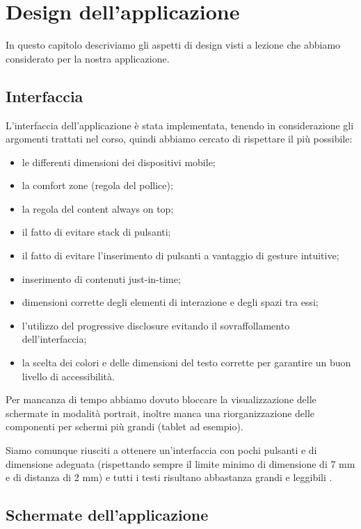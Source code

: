 \chapter{Design dell'applicazione\label{sec:design}}

In questo capitolo descriviamo gli aspetti di design visti a lezione che abbiamo considerato per la nostra applicazione.

\section{Interfaccia\label{sec:interfaccia}}
L'interfaccia dell'applicazione è stata implementata, tenendo in considerazione gli argomenti trattati nel corso, quindi abbiamo cercato di rispettare il più possibile:
\begin{itemize}
    \item le differenti dimensioni dei dispositivi mobile;%
    \item la comfort zone (regola del pollice);
    \item la regola del content always on top;
    \item il fatto di evitare stack di pulsanti;
    \item il fatto di evitare l'inserimento di pulsanti a vantaggio di gesture intuitive;
    \item inserimento di contenuti just-in-time;
    \item dimensioni corrette degli elementi di interazione e degli spazi tra essi;
    \item l'utilizzo del progressive disclosure evitando il sovraffollamento dell'interfaccia;
    \item la scelta dei colori e delle dimensioni del testo corrette per garantire un buon livello di accessibilità.
\end{itemize}

Per mancanza di tempo abbiamo dovuto bloccare la visualizzazione delle schermate in modalità portrait, inoltre manca una riorganizzazione delle componenti per schermi più grandi (tablet ad esempio).

Siamo comunque riusciti a ottenere un'interfaccia con pochi pulsanti e di dimensione adeguata (rispettando sempre il limite minimo di dimensione di 7 mm e di distanza di 2 mm) e tutti i testi risultano abbastanza grandi e leggibili \parencite{gaggi:mobileDesign}.

\section{Schermate dell'applicazione\label{sec:schermate}}

